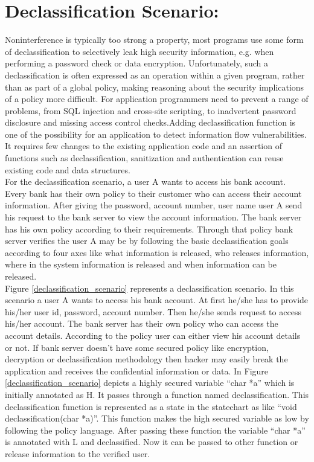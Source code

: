 \section{Declassification Scenario:}
 Noninterference is typically
 too strong a property, most programs use some form of declassification to selectively leak high security information, e.g. when performing a password check or data encryption. Unfortunately, such  a declassification is often expressed as an operation within a given  program, rather than as part of a global policy, making reasoning about the security implications of a policy more difficult. For application programmers need to prevent a range
 of problems, from SQL injection and cross-site scripting, to inadvertent password disclosure and missing access control checks.Adding declassification function is one of the possibility for an application to detect information flow vulnerabilities. It requires few changes to the existing application code and an assertion of functions such as declassification, sanitization and authentication can reuse existing code and data structures. \\
 
 For the declassification scenario, a user A wants to access his bank account. Every bank has their own policy to their customer who can access their account information. After giving the password, account number, user name user A send his request to the bank server to view the account information. The bank server has his own policy according to their requirements. Through that policy bank server verifies the user A may be by following the basic declassification goals according to four axes like what information is released,
 who releases information, where in the system information is released and when information can be released.  \\
 
 Figure \ref{declassification_scenario}  represents a declassification scenario. In this scenario a user A wants to access his bank account. At first he/she has to provide his/her user id, password, account number. Then he/she sends request to access his/her account. The bank server has their own policy who can access the account details. According to the policy user can either view his account details or not. If bank server doesn't have some secured policy like encryption, decryption or declassification methodology then hacker may easily break the application and receives the confidential information or data. In Figure \ref{declassification_scenario} depicts a highly secured variable \enquote{char *a} which is initially annotated as H. It passes through a function named declassification. This declassification function is represented as a state in the statechart as like \enquote{void declassification(char *a)}. This function makes the high secured variable as low by following the policy language. After passing these function the variable \enquote{char *a} is annotated with L and declassified. Now it can be passed to other function or release information to the verified user.\\
 

